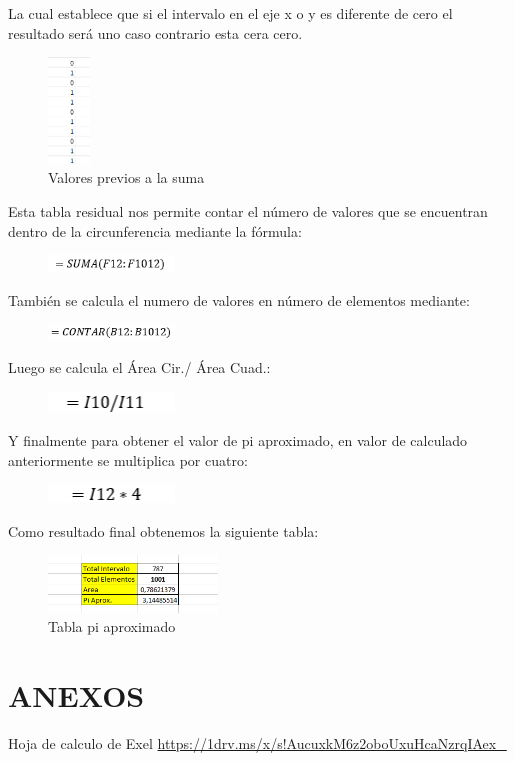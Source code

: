 \documentclass[letterpaper, 10 pt, conference]{ieeeconf}
\begin{document}
\newline
La cual establece que si el intervalo en el eje x o y es diferente de cero el resultado será uno caso contrario esta cera cero.
\begin{figure}[!ht]
\centering
\includegraphics[width=0.1\textwidth]{images/presum.png}
\caption{Valores previos a la suma}
\label{fig:estructurados}
\end{figure}
\newline
Esta tabla residual nos permite contar el número de valores que se encuentran dentro de la circunferencia mediante la fórmula: 
\begin{figure}[!ht]
\centering
\includegraphics[width=0.3\textwidth]{images/form4.png}
\label{fig:estructurados}
\end{figure}
\newline
También se calcula el numero de valores en número de elementos mediante:
\begin{figure}[!ht]
\centering
\includegraphics[width=0.3\textwidth]{images/form5.png}
\label{fig:estructurados}
\end{figure}
\newline
Luego se calcula el Área Cir./ Área Cuad.:
\begin{figure}[!ht]
\centering
\includegraphics[width=0.3\textwidth]{images/form6.png}
\label{fig:estructurados}
\end{figure}
\newline
Y finalmente para obtener el valor de pi aproximado, en valor de calculado anteriormente se multiplica por cuatro:
\begin{figure}[!ht]
\centering
\includegraphics[width=0.3\textwidth]{images/form7.png}
\label{fig:estructurados}
\end{figure}
\newline
Como resultado final obtenemos la siguiente tabla:
\begin{figure}[!ht]
\centering
\includegraphics[width=0.4\textwidth]{images/cuadrofinal.png}
\caption{Tabla pi aproximado}
\label{fig:estructurados}
\end{figure}
\newline
\section{\textbf{ANEXOS}}
Hoja de calculo de Exel 
\url{https://1drv.ms/x/s!AucuxkM6z2oboUxuHcaNzrqIAex_}




\end{document}
